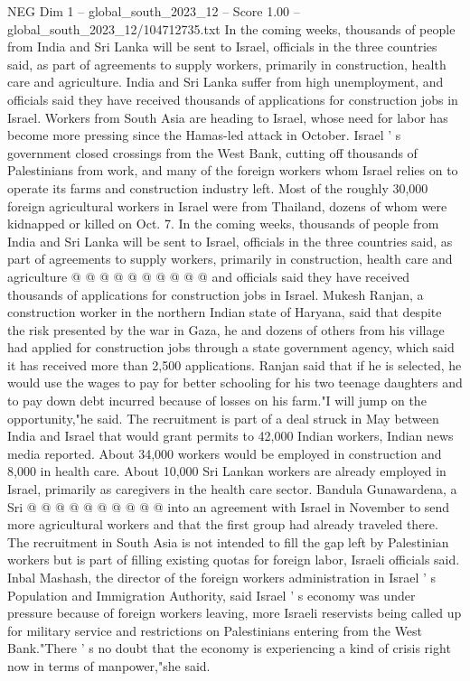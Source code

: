 \begin{textsample}{NEG Dim 1 – global\_south\_2023\_12 – Score 1.00 – global\_south\_2023\_12/104712735.txt}  \label{ex:f1_neg_290}
In the coming weeks, thousands of people from India and Sri Lanka will be sent to Israel, officials in the three countries said, as part of agreements to supply workers, primarily in construction, health care and agriculture.
India and Sri Lanka suffer from high unemployment, and officials said they have received thousands of applications for construction jobs in Israel.
Workers from South Asia are heading to Israel, whose need for labor has become more pressing since the Hamas-led attack in October.
Israel ' s government closed crossings from the West Bank, cutting off thousands of Palestinians from work, and many of the foreign workers whom Israel relies on to operate its farms and construction industry left.
Most of the roughly 30,000 foreign agricultural workers in Israel were from Thailand, dozens of whom were kidnapped or killed on Oct. 7.
In the coming weeks, thousands of people from India and Sri Lanka will be sent to Israel, officials in the three countries said, as part of agreements to supply workers, primarily in construction, health care and agriculture @ @ @ @ @ @ @ @ @ @ and officials said they have received thousands of applications for construction jobs in Israel.
Mukesh Ranjan, a construction worker in the northern Indian state of Haryana, said that despite the risk presented by the war in Gaza, he and dozens of others from his village had applied for construction jobs through a state government agency, which said it has received more than 2,500 applications.
Ranjan said that if he is selected, he would use the wages to pay for better schooling for his two teenage daughters and to pay down debt incurred because of losses on his farm."I will jump on the opportunity,"he said.
The recruitment is part of a deal struck in May between India and Israel that would grant permits to 42,000 Indian workers, Indian news media reported.
About 34,000 workers would be employed in construction and 8,000 in health care.
About 10,000 Sri Lankan workers are already employed in Israel, primarily as caregivers in the health care sector.
Bandula Gunawardena, a Sri @ @ @ @ @ @ @ @ @ @ into an agreement with Israel in November to send more agricultural workers and that the first group had already traveled there.
The recruitment in South Asia is not intended to fill the gap left by Palestinian workers but is part of filling existing quotas for foreign labor, Israeli officials said.
Inbal Mashash, the director of the foreign workers administration in Israel ' s Population and Immigration Authority, said Israel ' s economy was under pressure because of foreign workers leaving, more Israeli reservists being called up for military service and restrictions on Palestinians entering from the West Bank."There ' s no doubt that the economy is experiencing a kind of crisis right now in terms of manpower,"she said.

\end{textsample}
